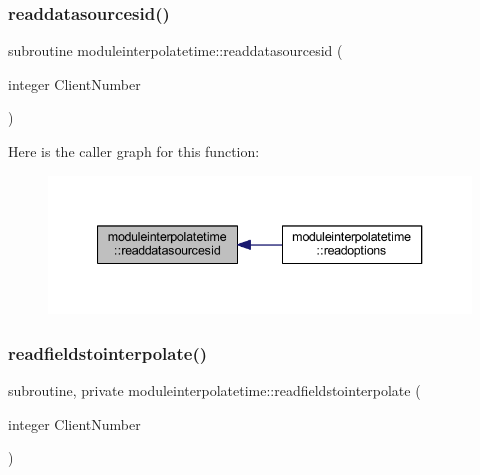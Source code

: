 \subsubsection{\texorpdfstring{readdatasourcesid()}{readdatasourcesid()}}
{\footnotesize\ttfamily subroutine moduleinterpolatetime\+::readdatasourcesid (\begin{DoxyParamCaption}\item[{integer}]{Client\+Number }\end{DoxyParamCaption})\hspace{0.3cm}{\ttfamily [private]}}

Here is the caller graph for this function\+:\nopagebreak
\begin{figure}[H]
\begin{center}
\leavevmode
\includegraphics[width=340pt]{namespacemoduleinterpolatetime_ad261b036016fd92d9944eb5b6d0332b6_icgraph}
\end{center}
\end{figure}
\mbox{\label{namespacemoduleinterpolatetime_a75df12a5adb5a489b09f35e20b069242}} 
\subsubsection{\texorpdfstring{readfieldstointerpolate()}{readfieldstointerpolate()}}
{\footnotesize\ttfamily subroutine, private moduleinterpolatetime\+::readfieldstointerpolate (\begin{DoxyParamCaption}\item[{integer}]{Client\+Number }\end{DoxyParamCaption})\hspace{0.3cm}{\ttfamily [private]}}

